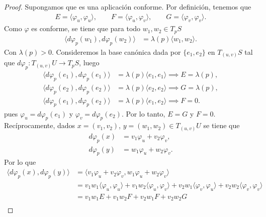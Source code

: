 \documentclass{article}
\begin{document}
\begin{proof}
    Supongamos que es una aplicación conforme. Por definición, tenemos que \begin{align*}
        E = \langle \varphi_u, \varphi_u \rangle, \qquad
        F = \langle \varphi_u, \varphi_v \rangle, \qquad
        G = \langle \varphi_v, \varphi_v \rangle.
    \end{align*}
    Como \( \varphi \) es conforme, se tiene que para todo \( w_1, w_2 \in T_p S \) \begin{align*}
        \langle d\varphi_p(w_1), d\varphi_p(w_2) \rangle & = \lambda(p) \langle w_1, w_2 \rangle.
    \end{align*}
    Con \( \lambda(p) > 0 \). Consideremos la base canónica dada por \( \{ e_1, e_2 \} \) en \( T_{(u, v)} S\) tal que
    \( d \varphi_p : T_{(u, v)} U \to T_{p} S \), luego \begin{align*}
        \langle d\varphi_p(e_1), d\varphi_p(e_1) \rangle & = \lambda(p) \langle e_1, e_1 \rangle \implies E = \lambda(p), \\
        \langle d\varphi_p(e_2), d\varphi_p(e_2) \rangle & = \lambda(p) \langle e_2, e_2 \rangle \implies G = \lambda(p), \\
        \langle d\varphi_p(e_1), d\varphi_p(e_2) \rangle & = \lambda(p) \langle e_1, e_2 \rangle \implies F = 0.
    \end{align*}
    pues \( \varphi_u = d\varphi_p(e_1) \) y \( \varphi_v = d\varphi_p(e_2) \). Por lo tanto, \( E = G \) y \( F = 0 \).
    Recíprocamente, dados \( x = (v_1, v_2) \), \( y = (w_1, w_2) \in T_{(u, v)} U \) se tiene que \begin{align*}
        d\varphi_p(x) & = v_1 \varphi_u + v_2 \varphi_v, \\
        d\varphi_p(y) & = w_1 \varphi_u + w_2 \varphi_v.
    \end{align*}
    Por lo que \begin{align*}
        \langle d\varphi_p(x), d\varphi_p(y) \rangle & = \langle v_1 \varphi_u + v_2 \varphi_v, w_1 \varphi_u + w_2 \varphi_v \rangle                                                                                                              \\
                                                     & = v_1 w_1 \langle \varphi_u, \varphi_u \rangle + v_1 w_2 \langle \varphi_u, \varphi_v \rangle + v_2 w_1 \langle \varphi_v, \varphi_u \rangle + v_2 w_2 \langle \varphi_v, \varphi_v \rangle \\
                                                     & = v_1 w_1 E + v_1 w_2 F + v_2 w_1 F + v_2 w_2 G                                                                                                                                             \\

\end{align*}
\end{proof}
\end{document}
